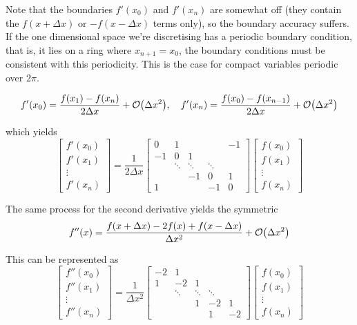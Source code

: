 \documentclass[11pt]{article}
\begin{document}
Note that the boundaries $f'(x_0)$ and $f'(x_n)$ are somewhat off (they contain the $f(x+\Delta x)$ or $-f(x-\Delta x)$ terms only), so the boundary accuracy suffers. If the one dimensional space we're discretising has a periodic boundary condition, that is, it lies on a ring where $x_{n+1} = x_0$, the boundary conditions must be consistent with this periodicity. This is the case for compact variables periodic over $2\pi$.

\begin{equation}
f'(x_0) = \frac{f(x_1) - f(x_n)}{2 \Delta x} + \order{\Delta x^2},
\quad
f'(x_n) = \frac{f(x_0) - f(x_{n-1})}{2 \Delta x} + \order{\Delta x^2}
\end{equation}

which yields
\begin{equation}
\begin{bmatrix}
	f'(x_0) \\ f'(x_1) \\ \vdots \\ f'(x_n)
\end{bmatrix}
=
\frac{1}{2 \Delta x}
\begin{bmatrix}
	0 & 1 & & & -1 \\
	-1 & 0 & 1 \\
	& \ddots & \ddots & \ddots \\
	& & -1 & 0 & 1 \\
	1 & & & -1 & 0
\end{bmatrix}
\begin{bmatrix}
	f(x_0) \\ f(x_1) \\ \vdots \\ f(x_n)
\end{bmatrix}
\end{equation}


The same process for the second derivative yields the symmetric
\begin{equation}
f''(x) = \frac{f(x + \Delta x) - 2 f(x) + f(x - \Delta x)}{\Delta x^2} + \order{\Delta x^2}
\end{equation}

This can be represented as
\begin{equation}
\begin{bmatrix}
	f''(x_0) \\ f''(x_1) \\ \vdots \\ f''(x_n)
\end{bmatrix}
=
\frac{1}{\Delta x^2}
\begin{bmatrix}
	-2 & 1 \\
	1 & -2 & 1 \\
	& \ddots & \ddots & \ddots \\
	& & 1 & -2 & 1 \\
	& & & 1 & -2
\end{bmatrix}
\begin{bmatrix}
	f(x_0) \\ f(x_1) \\ \vdots \\ f(x_n)
\end{bmatrix}
\end{equation}
\end{document}

